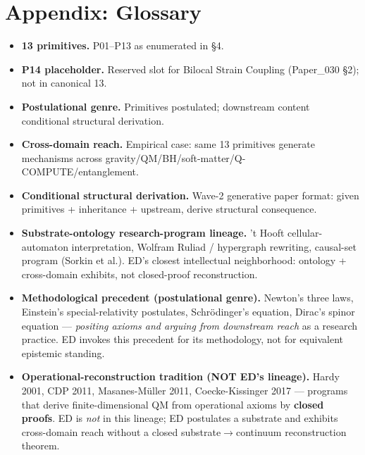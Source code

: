 \documentclass[11pt,a4paper]{article}
\begin{document}
\section*{Appendix: Glossary}

\begin{itemize}[noitemsep]
\item \textbf{13 primitives.} P01--P13 as enumerated in \S4.
\item \textbf{P14 placeholder.} Reserved slot for Bilocal Strain Coupling (Paper\_030 \S2); not in canonical 13.
\item \textbf{Postulational genre.} Primitives postulated; downstream content conditional structural derivation.
\item \textbf{Cross-domain reach.} Empirical case: same 13 primitives generate mechanisms across gravity/QM/BH/soft-matter/Q-COMPUTE/entanglement.
\item \textbf{Conditional structural derivation.} Wave-2 generative paper format: given primitives + inheritance + upstream, derive structural consequence.
\item \textbf{Substrate-ontology research-program lineage.} 't Hooft cellular-automaton interpretation, Wolfram Ruliad / hypergraph rewriting, causal-set program (Sorkin et al.). ED's closest intellectual neighborhood: ontology + cross-domain exhibits, not closed-proof reconstruction.
\item \textbf{Methodological precedent (postulational genre).} Newton's three laws, Einstein's special-relativity postulates, Schr\"odinger's equation, Dirac's spinor equation --- \emph{positing axioms and arguing from downstream reach} as a research practice. ED invokes this precedent for its methodology, not for equivalent epistemic standing.
\item \textbf{Operational-reconstruction tradition (NOT ED's lineage).} Hardy 2001, CDP 2011, Masanes-M\"uller 2011, Coecke-Kissinger 2017 --- programs that derive finite-dimensional QM from operational axioms by \textbf{closed proofs}. ED is \emph{not} in this lineage; ED postulates a substrate and exhibits cross-domain reach without a closed substrate$\to$continuum reconstruction theorem.
\end{itemize}
\end{document}
